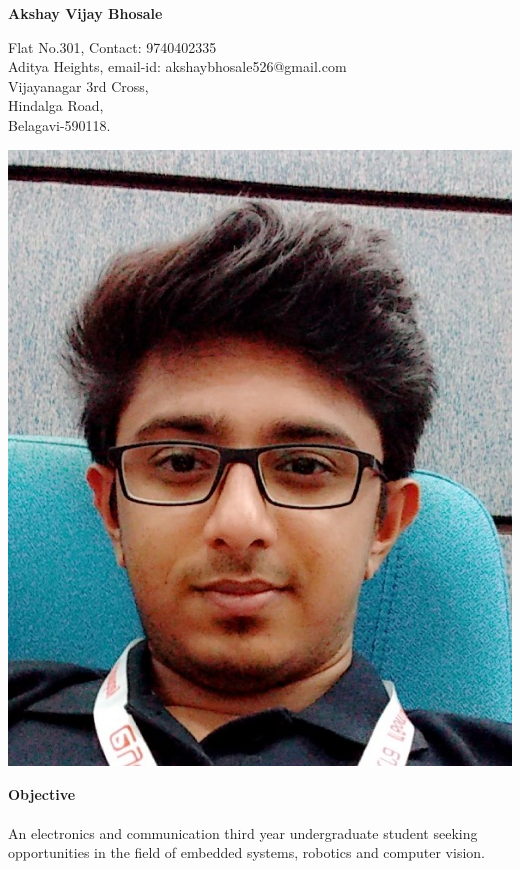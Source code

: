 \documentclass[15pt]{article}
\begin{document}
\begin{center}
	\huge{\textbf{Akshay Vijay Bhosale}} \\
\end{center}
\noindent \hrulefill
\begin{flushleft}
	\large{
		Flat No.301, \hfill
		Contact: 9740402335  \\
		Aditya Heights, \hfill 	email-id: akshaybhosale526@gmail.com \\
		Vijayanagar 3rd Cross, \\
		Hindalga Road, \\
		Belagavi-590118.}
\end{flushleft}
\begin{center}
	\includegraphics[scale=0.15]{pic.PNG}
\end{center}
\vspace{1mm}
\begin{flushleft}
	{\textbf{Objective }} \\
	\vspace{0.5mm}
	\noindent \hrulefill
	\vspace{0.5mm} \\
	An electronics and communication third year undergraduate student seeking opportunities in the field of embedded systems, robotics and computer vision. \\
\end{flushleft}
\end{document}
